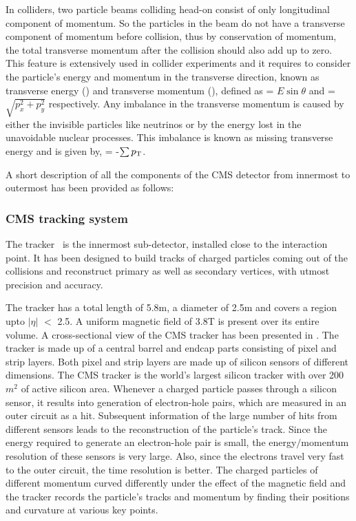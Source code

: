 In colliders, two particle beams colliding head-on consist of only longitudinal component of momentum. So the particles in the beam do not have a transverse component
of momentum before collision, thus by conservation of momentum, the total transverse momentum after the collision should also add up to zero. This feature is
extensively used in collider experiments and it requires to consider the
particle's energy and momentum in the transverse direction, known as transverse energy (\et) and transverse momentum (\pt), defined as
\et = $E\sin\theta$ and \pt = $\sqrt{p_{x}^{2} + p_{y}^{2}}$ respectively.  
Any imbalance in the transverse momentum is caused by either the invisible particles like neutrinos or by the energy lost in the unavoidable nuclear processes.
This imbalance is known as missing transverse energy and is given by, \met = -$\sum{\ensuremath{p_{\mathrm T}}}$.
    
A short description of all the components of the CMS detector from innermost to outermost has been provided as follows:

\subsubsection{CMS tracking system}\label{Se:CMS_tracker}
The tracker~\cite{Chatrchyan:2008aa,Karimaki:368412} is the innermost sub-detector, installed close to the interaction point. It has been designed to
build tracks of charged particles coming out of the collisions and reconstruct primary as well as secondary vertices, with utmost precision and accuracy.     

The tracker has a total length of 5.8\unit{m}, a diameter of 2.5\unit{m} and covers a region upto $|\eta|$ $<$ 2.5.
A uniform magnetic field of 3.8\unit{T} is present over its entire volume. 
A cross-sectional view of the CMS tracker has been presented in \fig{\ref{fig:CMS_tracker}}. The tracker is made up of a central barrel and
endcap parts consisting of pixel and strip layers. Both pixel and strip layers are made up of silicon sensors of different dimensions.
The CMS tracker is the world's largest silicon tracker with over 200$\unit{m}^{2}$ of active silicon area. 
Whenever a charged particle passes through a silicon sensor, it results into generation of electron-hole pairs,
which are measured in an outer circuit as a hit. Subsequent information of the large number of hits from different sensors
leads to the reconstruction of the particle's track.
Since the energy required to generate an electron-hole pair is small, the energy$/$momentum resolution of these sensors
is very large. Also, since the electrons travel very fast to the outer circuit, the time resolution is better. 
The charged particles of different momentum curved differently under the effect of
the magnetic field and the tracker records the particle's tracks and momentum by finding their positions and curvature at various key points.  

